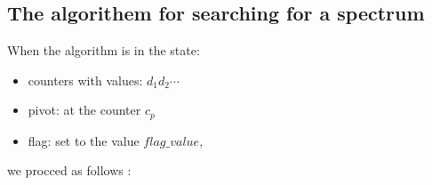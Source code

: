 \subsection{The algorithem for searching for a spectrum}
When the algorithm is in the state: 
\begin{itemize}
\item counters with values: $d_1d_2\cdots$
\item pivot: at the counter $c_p$
\item flag: set to the value $flag\_value$,
\end{itemize}
we procced as follows 
:
